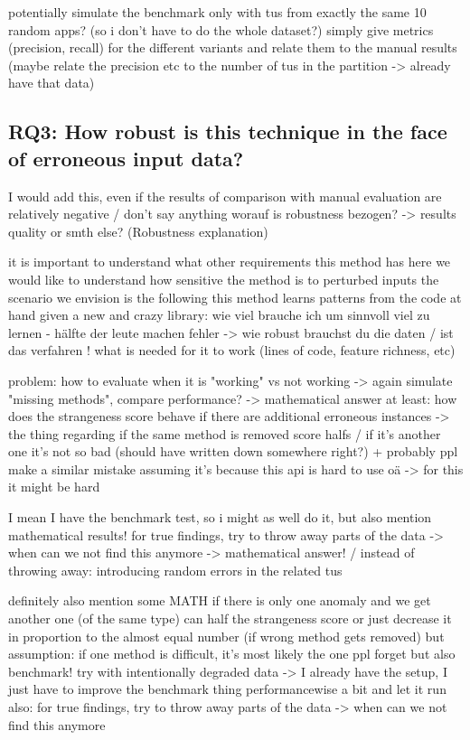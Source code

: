 potentially simulate the benchmark only with tus from exactly the same 10 random apps? (so i don't have to do the whole dataset?)
simply give metrics (precision, recall) for the different variants and relate them to the manual results
(maybe relate the precision etc to the number of tus in the partition -> already have that data)

\subsection{RQ3: How robust is this technique in the face of erroneous input data?}

I would add this, even if the results of comparison with manual evaluation are relatively negative / don't say anything
worauf is robustness bezogen? -> results quality or smth else? (Robustness explanation)

it is important to understand what other requirements this method has
here we would like to understand how sensitive the method is to perturbed inputs
the scenario we envision is the following
    this method learns patterns from the code at hand
    given a new and crazy library:
    wie viel brauche ich um sinnvoll viel zu lernen - hälfte der leute machen fehler -> wie robust brauchst du die daten / ist das verfahren !
    what is needed for it to work (lines of code, feature richness, etc) 

problem: how to evaluate when it is "working" vs not working -> again simulate "missing methods", compare performance?
-> mathematical answer at least: how does the strangeness score behave if there are additional erroneous instances
    -> the thing regarding if the same method is removed score halfs / if it's another one it's not so bad (should have written down somewhere right?)
    + probably ppl make a similar mistake assuming it's because this api is hard to use oä
    -> for this it might be hard

I mean I have the benchmark test, so i might as well do it, but also mention mathematical results!
for true findings, try to throw away parts of the data -> when can we not find this anymore -> mathematical answer!
/ instead of throwing away: introducing random errors in the related tus

definitely also mention some MATH
    if there is only one anomaly and we get another one (of the same type) can half the strangeness score
    or just decrease it in proportion to the almost equal number (if wrong method gets removed)
    but assumption: if one method is difficult, it's most likely the one ppl forget
but also benchmark!
try with intentionally degraded data -> I already have the setup, I just have to improve the benchmark thing performancewise a bit and let it run
also: for true findings, try to throw away parts of the data -> when can we not find this anymore

